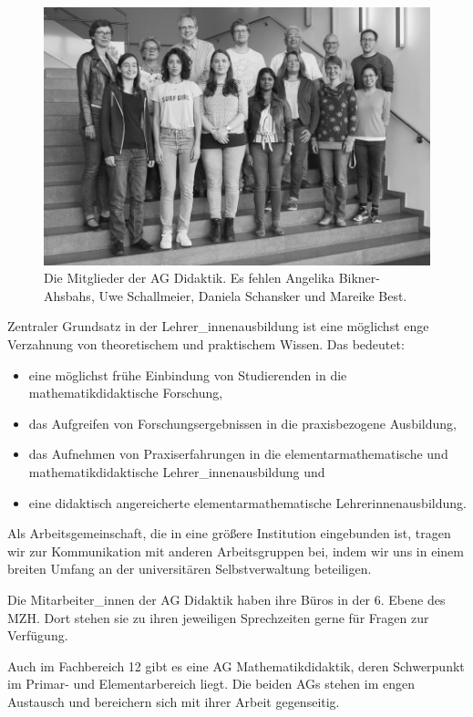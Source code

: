 \documentclass[ngerman,bibliography=totoc,oneside,12pt,a4paper]{scrbook}
\begin{document}
\begin{figure}
\centering
\includegraphics{ag_web_bw.jpg}
\caption{\label{fig:ID}Die Mitglieder der AG Didaktik. Es fehlen Angelika
Bikner-Ahsbahs, Uwe Schallmeier, Daniela Schansker und Mareike Best.}
\end{figure}

Zentraler Grundsatz in der Lehrer\_innenausbildung ist eine möglichst
enge Verzahnung von theoretischem und praktischem Wissen. Das bedeutet:

\begin{itemize}
\item
  eine möglichst frühe Einbindung von Studierenden in die
  mathematikdidaktische Forschung,
\item
  das Aufgreifen von Forschungsergebnissen in die praxisbezogene
  Ausbildung,
\item
  das Aufnehmen von Praxiserfahrungen in die elementarmathematische und
  mathematikdidaktische Lehrer\_innenausbildung und
\item
  eine didaktisch angereicherte elementarmathematische
  Lehrerinnenausbildung.
\end{itemize}

Als Arbeitsgemeinschaft, die in eine größere Institution eingebunden
ist, tragen wir zur Kommunikation mit anderen Arbeitsgruppen bei, indem
wir uns in einem breiten Umfang an der universitären Selbstverwaltung
beteiligen.

Die Mitarbeiter\_innen der AG Didaktik haben ihre Büros in der 6. Ebene
des MZH. Dort stehen sie zu ihren jeweiligen Sprechzeiten gerne für
Fragen zur Verfügung.

Auch im Fachbereich 12 gibt es eine AG Mathematikdidaktik, deren
Schwerpunkt im Primar- und Elementarbereich liegt. Die beiden AGs stehen
im engen Austausch und bereichern sich mit ihrer Arbeit gegenseitig.
\end{document}
